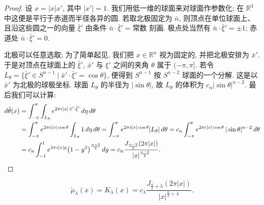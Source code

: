 \begin{proof}
设 $x=|x|x'$, 其中 $|x'|=1$. 我们用低一维的球面来对球面作参数化; 在 $\mathbb{R}^3$ 中这便是平行于赤道而半径各异的圆. 若取北极固定为 $\bar{n}$, 则顶点在单位球面上、且沿这些圆之一的向量 $\bar{\xi}'$ 由条件 $\bar{n}\cdot\bar{\xi}'=\text{常数}$ 刻画. 极点处当然有 $\bar{n}\cdot\bar{\xi}'=\pm 1$; 赤道处 $\bar{n}\cdot\bar{\xi}'=0$.

北极可以任意选取; 为了简单起见, 我们把 $x\in\mathbb{R}^n$ 视为固定的, 并把北极安排为 $\bar{x}'$. 于是对顶点在球面上的 $\bar{\xi}'$, $\bar{x}'$ 与 $\xi'$ 之间的夹角 $\theta$ 属于 $(-\pi,\pi]$. 若令 $L_\theta=\{\bar{\xi}'\in S^{n-1} \mid \bar{x}'\cdot\bar{\xi}'=\cos\theta\}$, 便得到 $S^{n-1}$ 按 $S^{n-2}$ 球面的一个分解. 这是以 $\bar{x}'$ 为北极的球极坐标. 球面 $L_\theta$ 的半径为 $|\sin\theta|$, 故 $L_\theta$ 的体积为 $c_n|\sin\theta|^{n-2}$. 最后我们可以计算:
\begin{align*}
d\check{\theta}(x)&=\int_{-\pi}^{\pi}\int_{L_{\theta}}e^{2\pi i|x|\,\bar{x}'\cdot\bar{\xi}'}\,d\eta\,d\theta \\
&=\int_{-\pi}^{\pi}e^{2\pi i|x|\cos\theta}\int_{L_{\theta}}1\,d\eta\,d\theta
=\int_{-\pi}^{\pi}e^{2\pi i|x|\cos\theta}|L_{\theta}|\,d\theta
=c_{n}\int_{-\pi}^{\pi}e^{2\pi i|x|\cos\theta}\,|\sin\theta|^{n-2}\,d\theta \\
&=c_{n}\int_{-1}^{1}e^{2\pi i|x|y}\bigl(1-y^{2}\bigr)^{\frac{n-3}{2}}\,dy
=c_{n}\frac{J_{\frac{n-2}{2}}(2\pi|x|)}{|x|^{\frac{n-2}{2}}}. \qedhere
\end{align*}
\end{proof}

\begin{proposition}\label{prop:5.2}
\[
\check{\mu}_{\lambda}(x)=K_{\lambda}(x)
=c_{\lambda}\frac{J_{\frac{n}{2}+\lambda}(2\pi|x|)}{|x|^{\frac{n}{2}+\lambda}}.
\]
\end{proposition}


